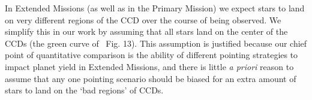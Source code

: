 In Extended Missions (as well as in the Primary Mission) we expect stars to land on very different regions of the CCD over the course of being observed.
We simplify this in our work by assuming that all stars land on the center of the \tess CCDs (the green curve of~ Fig. 13). 
This assumption is justified because our chief point of quantitative comparison is the ability of different pointing strategies to impact \tesss planet yield in Extended Missions, and there is little \textit{a priori} reason to assume that any one pointing scenario should be biased for an extra amount of stars to land on the `bad regions' of \tesss CCDs.
	
